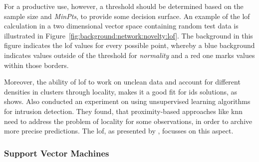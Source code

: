 For a productive use, however, a threshold should be determined based on the sample size and \emph{MinPts}, to provide some decision surface.
An example of the \gls{lof} calculation in a two dimensional vector space containing random test data is illustrated in Figure~\ref{fig:background:network:novelty:lof}.
The background in this figure indicates the \gls{lof} values for every possible point, whereby a blue background indicates values outside of the threshold for \emph{normality} and a red one marks values within those borders.

\vspace{8pt}
Moreover, the ability of \gls{lof} to work on unclean data and account for different densities in clusters through locality, makes it a good fit for \gls{ids} solutions, as \textcite{Lazarevic2003} shows.
Also \textcite{Zanero2004} conducted an experiment on using unsupervised learning algorithms for intrusion detection. They found, that proximity-based approaches like \gls{knn} need to address the problem of locality for some observations, in order to archive more precise predictions. The \gls{lof}, as presented by \textcite{Breunig2000}, focusses on this aspect.

\subsubsection{Support Vector Machines}
\label{sec:background:network:novelty:svm}


